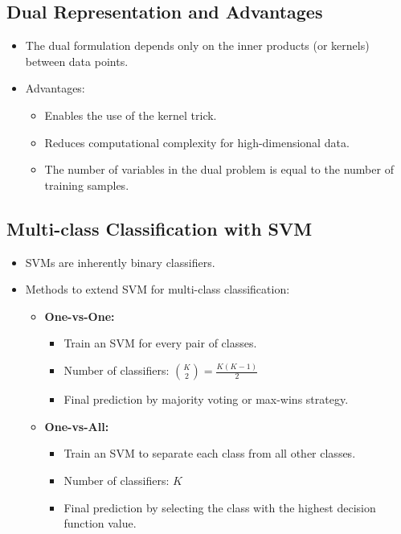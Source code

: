 \documentclass{article}
\begin{document}
\subsection{Dual Representation and Advantages}

\begin{itemize}
    \item The dual formulation depends only on the inner products (or kernels) between data points.
    \item Advantages:
    \begin{itemize}
        \item Enables the use of the kernel trick.
        \item Reduces computational complexity for high-dimensional data.
        \item The number of variables in the dual problem is equal to the number of training samples.
    \end{itemize}
\end{itemize}

\subsection{Multi-class Classification with SVM}

\begin{itemize}
    \item SVMs are inherently binary classifiers.
    \item Methods to extend SVM for multi-class classification:
    \begin{itemize}
        \item \textbf{One-vs-One:}
        \begin{itemize}
            \item Train an SVM for every pair of classes.
            \item Number of classifiers: $\binom{K}{2} = \frac{K(K-1)}{2}$
            \item Final prediction by majority voting or max-wins strategy.
        \end{itemize}
        \item \textbf{One-vs-All:}
        \begin{itemize}
            \item Train an SVM to separate each class from all other classes.
            \item Number of classifiers: $K$
            \item Final prediction by selecting the class with the highest decision function value.
        \end{itemize}
    \end{itemize}
\end{itemize}
\end{document}
